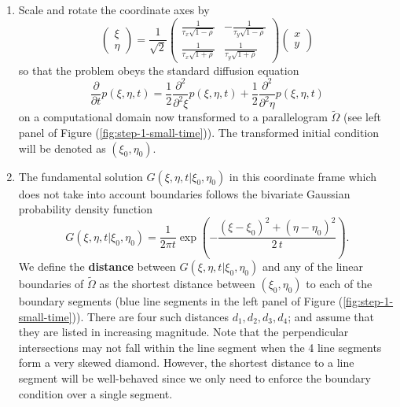 \documentclass[10pt]{article}
\begin{document}
\begin{enumerate}[1.]
\item Scale and rotate the coordinate axes by
  \[
    \left( \begin{array}{c}
             \xi \\
             \eta
           \end{array} \right) = \frac{1}{\sqrt{2}}
         \left( \begin{array}{cc}
                  \frac{1}{\tau_x \sqrt{1-\rho}} & -\frac{1}{\tau_y\sqrt{1-\rho}}\\
                  \frac{1}{\tau_x \sqrt{1+\rho}} & \frac{1}{\tau_y\sqrt{1+\rho}}
                \end{array} \right)
             \left( \begin{array}{cc}
             x \\
             y
           \end{array} \right) 
       \]
       so that the problem obeys the standard diffusion equation
       \[
         \frac{\partial }{\partial t}p(\xi,\eta,t) =
         \frac{1}{2}\frac{\partial^2 }{\partial^2 \xi} p(\xi,\eta,t)+
         \frac{1}{2}\frac{\partial^2 }{\partial^2 \eta} p(\xi,\eta,t)
       \]
       on a computational domain now transformed to a parallelogram
       $\tilde{\Omega}$ (see left panel of Figure
       (\ref{fig:step-1-small-time})). The transformed initial
       condition will be denoted as $(\xi_0, \eta_0)$.

     \item The fundamental solution $G(\xi,\eta,t | \xi_0, \eta_0)$ in
       this coordinate frame which does not take into account
       boundaries follows the bivariate Gaussian probability density
       function
  \[
    G(\xi,\eta,t | \xi_0, \eta_0) = \frac{1}{2\pi t} \exp\left(-\frac{(\xi-\xi_0)^2 +
        (\eta-\eta_0)^2}{2\,t} \right).
  \]
  We define the \textbf{distance} between
  $G(\xi,\eta,t | \xi_0, \eta_0)$ and any of the linear boundaries of
  $\tilde{\Omega}$ as the shortest distance between $(\xi_0, \eta_0)$
  to each of the boundary segments (blue line segments in the left
  panel of Figure (\ref{fig:step-1-small-time})).  There are four such
  distances $d_1, d_2, d_3, d_4$; and assume that they are listed in
  increasing magnitude. Note that the perpendicular intersections may
  not fall within the line segment when the 4 line segments form a
  very skewed diamond. However, the shortest distance to a line
  segment will be well-behaved since we only need to enforce the
  boundary condition over a single segment.


\end{enumerate}
\end{document}
